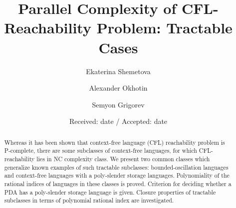 \documentclass[smallextended]{svjour3}       %
\begin{document}
\title{Parallel Complexity of CFL-Reachability Problem: Tractable Cases%
}


\author{Ekaterina Shemetova         \and
         Alexander Okhotin
         \and Semyon Grigorev %
}



\date{Received: date / Accepted: date}


\maketitle

\begin{abstract}
Whereas it has been shown that  context-free language (CFL) reachability problem is P-complete, there are some subclasses of context-free languages, for which CFL-reachability lies in NC complexity class. We present two common classes which generalize known examples of such tractable subclasses: bounded-oscillation languages and context-free languages with a poly-slender storage languages. Polynomiality of the rational indices of languages in these classes is proved. Criterion for deciding whether a PDA has a poly-slender storage language is given. Closure properties of tractable subclasses in terms of polynomial rational index are investigated. 




\end{abstract}
\end{document}
